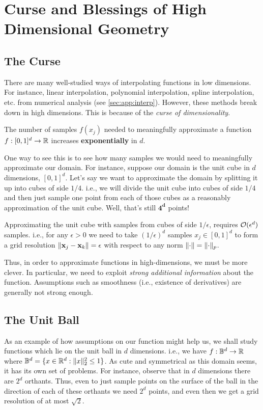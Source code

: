 \section{Curse and Blessings of High Dimensional Geometry}
\subsection{The Curse}
There are many well-studied ways of interpolating functions in low dimensions. For instance, linear interpolation, polynomial interpolation, spline interpolation, etc. from numerical analysis (see \autoref{sec:app:interp}). However, these methods break down in high dimensions. This is because of the {\em curse of dimensionality}.
\begin{curse}
The number of samples $f(x_j)$ needed to meaningfully approximate a function $f: [0,1]^d \to \mathbb{R}$ increases {\bf exponentially} in $d$.
\end{curse}
One way to see this is to see how many samples we would need to meaningfully approximate our domain. For instance, suppose our domain is the unit cube in $d$ dimensions, $[0,1]^d$. Let's say we want to approximate the domain by splitting it up into cubes of side $1/4$. i.e., we will divide the unit cube into cubes of side $1/4$ and then just sample one point from each of those cubes as a reasonably approximation of the unit cube. Well, that's still $\mathbf{4^d}$ points!
\begin{theorem}
Approximating the unit cube with samples from cubes of side $1/\epsilon$, requires $\mathcal{O}(\epsilon^d)$ samples. i.e., for any $\epsilon > 0$ we need to take $(1/\epsilon)^d$ samples $x_j \in [0,1]^d$ to form a grid resolution $\lVert {\mathbf{x}}_j - \mathbf{x}_k \rVert = \epsilon$ with respect to any norm $\lVert \cdot \rVert = \lVert \cdot \rVert_p$.
\end{theorem}
Thus, in order to approximate functions in high-dimensions, we must be more clever. In particular, we need to exploit {\em strong additional information} about the function. Assumptions such as smoothness (i.e., existence of derivatives) are generally not strong enough.

\subsection{The Unit Ball}
As an example of how assumptions on our function might help us, we shall study functions which lie on the unit ball in $d$ dimensions. i.e., we have $f: \mathbb{B}^d \to \mathbb{R}$ where $\mathbb{B}^d = \{ x \in \mathbb{R}^d: \lVert x \rVert_2^2 \leq 1 \}$. As cute and symmetrical as this domain seems, it has its own set of problems. For instance, observe that in $d$ dimensions there are $2^d$ orthants. Thus, even to just sample points on the surface of the ball in the direction of each of these orthants we need $2^d$ points, and even then we get a grid resolution of at most $\sqrt{2}$.

